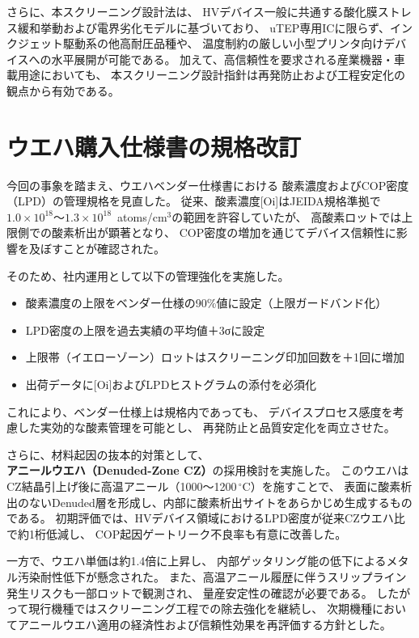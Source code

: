 \documentclass[twocolumn]{ieeetran}
\begin{document}
さらに、本スクリーニング設計法は、
HVデバイス一般に共通する酸化膜ストレス緩和挙動および電界劣化モデルに基づいており、
uTEP専用ICに限らず、インクジェット駆動系の他高耐圧品種や、
温度制約の厳しい小型プリンタ向けデバイスへの水平展開が可能である。
加えて、高信頼性を要求される産業機器・車載用途においても、
本スクリーニング設計指針は再発防止および工程安定化の観点から有効である。

\section{ウエハ購入仕様書の規格改訂}

今回の事象を踏まえ、ウエハベンダー仕様書における
酸素濃度およびCOP密度（LPD）の管理規格を見直した。
従来、酸素濃度[Oi]はJEIDA規格準拠で
$1.0\times10^{18}$～$1.3\times10^{18}$~atoms/cm$^3$の範囲を許容していたが、
高酸素ロットでは上限側での酸素析出が顕著となり、
COP密度の増加を通じてデバイス信頼性に影響を及ぼすことが確認された。

そのため、社内運用として以下の管理強化を実施した。

\begin{itemize}
  \item 酸素濃度の上限をベンダー仕様の90\%値に設定（上限ガードバンド化）
  \item LPD密度の上限を過去実績の平均値＋3σに設定
  \item 上限帯（イエローゾーン）ロットはスクリーニング印加回数を＋1回に増加
  \item 出荷データに[Oi]およびLPDヒストグラムの添付を必須化
\end{itemize}

これにより、ベンダー仕様上は規格内であっても、
デバイスプロセス感度を考慮した実効的な酸素管理を可能とし、
再発防止と品質安定化を両立させた。

\bigskip
\noindent
さらに、材料起因の抜本的対策として、
\textbf{アニールウエハ（Denuded-Zone CZ）}の採用検討を実施した。
このウエハはCZ結晶引上げ後に高温アニール（1000～1200\,$^\circ$C）を施すことで、
表面に酸素析出のないDenuded層を形成し、内部に酸素析出サイトをあらかじめ生成するものである。
初期評価では、HVデバイス領域におけるLPD密度が従来CZウエハ比で約1桁低減し、
COP起因ゲートリーク不良率も有意に改善した。

一方で、ウエハ単価は約1.4倍に上昇し、
内部ゲッタリング能の低下によるメタル汚染耐性低下が懸念された。
また、高温アニール履歴に伴うスリップライン発生リスクも一部ロットで観測され、
量産安定性の確認が必要である。
したがって現行機種ではスクリーニング工程での除去強化を継続し、
次期機種においてアニールウエハ適用の経済性および信頼性効果を再評価する方針とした。
\end{document}
